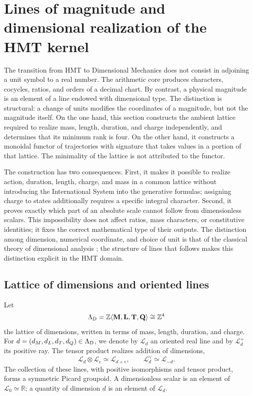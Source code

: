 
\chapter{Lines of magnitude and dimensional realization of the HMT kernel}
\label{chap:funtor-dimensional-hmt}

The transition from HMT to Dimensional Mechanics does not consist in adjoining a unit symbol to a real number. The arithmetic core produces characters, cocycles, ratios, and orders of a decimal chart. By contrast, a physical magnitude is an element of a line endowed with dimensional type. The distinction is structural: a change of units modifies the coordinates of a magnitude, but not the magnitude itself. On the one hand, this section constructs the ambient lattice required to realize mass, length, duration, and charge independently, and determines that its minimum rank is four. On the other hand, it constructs a monoidal functor of trajectories with signature that takes values in a portion of that lattice. The minimality of the lattice is not attributed to the functor.

The construction has two consequences. First, it makes it possible to realize action, duration, length, charge, and mass in a common lattice without introducing the International System into the generative formulas; assigning charge to states additionally requires a specific integral character. Second, it proves exactly which part of an absolute scale cannot follow from dimensionless scalars. This impossibility does not affect ratios, mass characters, or constitutive identities; it fixes the correct mathematical type of their outputs. The distinction among dimension, numerical coordinate, and choice of unit is that of the classical theory of dimensional analysis \cite{Buckingham1914,Bridgman1931}; the structure of lines that follows makes this distinction explicit in the HMT domain\@.

\section{Lattice of dimensions and oriented lines}

Let
\[
 \Lambda_{\rm D}
 =\mathbb Z\langle \mathbf M,\mathbf L,\mathbf T,\mathbf Q\rangle
 \cong\mathbb Z^4
\]
the lattice of dimensions, written in terms of mass, length, duration, and
charge. For \(d=(d_M,d_L,d_T,d_Q)\in\Lambda_{\rm D}\), we denote by \(\mathcal L_d\) an oriented real line
and by \(\mathcal L_d^+\) its positive ray. The tensor product realizes addition
of dimensions,
\[
 \mathcal L_d\otimes\mathcal L_e\simeq\mathcal L_{d+e},
 \qquad
 \mathcal L_d^\vee\simeq\mathcal L_{-d}.
\]
The collection of these lines, with positive isomorphisms and tensor
product, forms a symmetric Picard groupoid. A dimensionless scalar is
an element of \(\mathcal L_0\simeq\mathbb R\); a quantity of dimension
\(d\) is an element of \(\mathcal L_d\).

